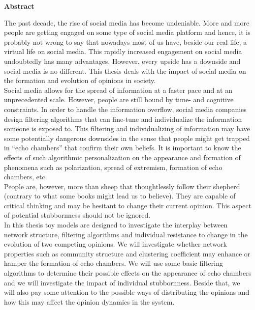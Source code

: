 \documentclass[11 pt , letterpaper , twoside , openright]{book}
\newenvironment{abstract}%
{\cleardoublepage\null \vfill\begin{center}\bfseries \abstractname \end{center}}{\vfill\null}
\begin{document}
\renewcommand{\abstractname}{Abstract}
\begin{abstract}
\thispagestyle{plain}
\setcounter{page}{\value{abstractpage}}

\noindent
The past decade, the rise of social media has become undeniable. More and more people are getting engaged on some type of social media platform and hence, it is probably not wrong to say that nowadays most of us have, beside our real life, a virtual life on social media. This rapidly increased engagement on social media undoubtedly has many advantages. However, every upside has a downside and social media is no different. This thesis deals with the impact of social media on the formation and evolution of opinions in society.\\ 
\newline
Social media allows for the spread of information at a faster pace and at an unprecedented scale. However, people are still bound by time- and cognitive constraints. In order to handle the information overflow, social media companies design filtering algorithms that can fine-tune and individualize the information someone is exposed to. This filtering and individualizing of information may have some potentially dangerous downsides in the sense that people might get trapped in ``echo chambers'' that confirm their own beliefs. It is important to know the effects of such algorithmic personalization on the appearance and formation of phenomena such as polarization, spread of extremism, formation of echo chambers, etc.\\
\newline
People are, however, more than sheep that thoughtlessly follow their shepherd (contrary to what some books might lead us to believe). They are capable of critical thinking and may be hesitant to change their current opinion. This aspect of potential stubbornness should not be ignored.\\
\newline
In this thesis toy models are designed to investigate the interplay between network structure, filtering algorithms and individual resistance to change in the evolution of two competing opinions. We will investigate whether network properties such as community structure and clustering coefficient may enhance or hamper the formation of echo chambers. We will use some basic filtering algorithms to determine their possible effects on the appearance of echo chambers and we will investigate the impact of individual stubbornness. Beside that, we will also pay some attention to the possible ways of distributing the opinions and how this may affect the opinion dynamics in the system. \\

\end{abstract}
\end{document}
